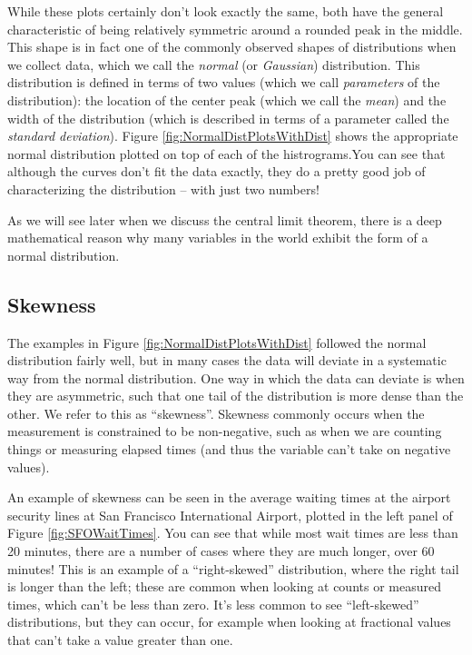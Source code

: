 \documentclass[12pt,]{book}
\theoremstyle{definition}
\theoremstyle{definition}
\theoremstyle{definition}
\theoremstyle{remark}
\begin{document}
While these plots certainly don't look exactly the same, both have the general characteristic of being relatively symmetric around a rounded peak in the middle. This shape is in fact one of the commonly observed shapes of distributions when we collect data, which we call the \emph{normal} (or \emph{Gaussian}) distribution. This distribution is defined in terms of two values (which we call \emph{parameters} of the distribution): the location of the center peak (which we call the \emph{mean}) and the width of the distribution (which is described in terms of a parameter called the \emph{standard deviation}). Figure \ref{fig:NormalDistPlotsWithDist} shows the appropriate normal distribution plotted on top of each of the histrograms.You can see that although the curves don't fit the data exactly, they do a pretty good job of characterizing the distribution -- with just two numbers!

As we will see later when we discuss the central limit theorem, there is a deep mathematical reason why many variables in the world exhibit the form of a normal distribution.

\hypertarget{skewness}{%
\subsection{Skewness}\label{skewness}}

The examples in Figure \ref{fig:NormalDistPlotsWithDist} followed the normal distribution fairly well, but in many cases the data will deviate in a systematic way from the normal distribution. One way in which the data can deviate is when they are asymmetric, such that one tail of the distribution is more dense than the other. We refer to this as ``skewness''. Skewness commonly occurs when the measurement is constrained to be non-negative, such as when we are counting things or measuring elapsed times (and thus the variable can't take on negative values).

An example of skewness can be seen in the average waiting times at the airport security lines at San Francisco International Airport, plotted in the left panel of Figure \ref{fig:SFOWaitTimes}. You can see that while most wait times are less than 20 minutes, there are a number of cases where they are much longer, over 60 minutes! This is an example of a ``right-skewed'' distribution, where the right tail is longer than the left; these are common when looking at counts or measured times, which can't be less than zero. It's less common to see ``left-skewed'' distributions, but they can occur, for example when looking at fractional values that can't take a value greater than one.
\end{document}
